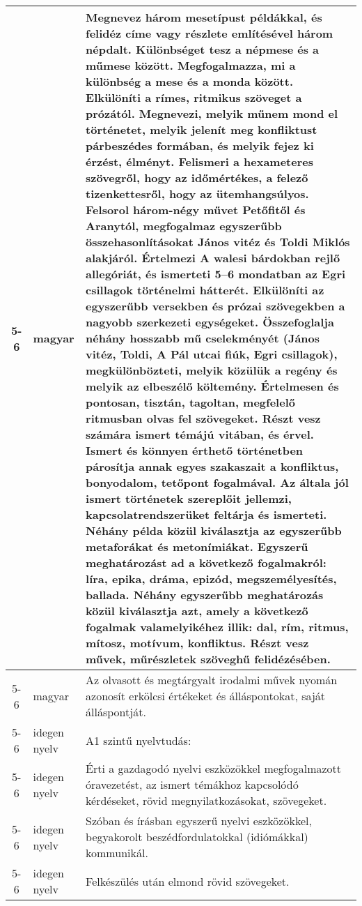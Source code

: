 \begin{small}
\begin{longtable}{c | p{2cm} |  p{11cm} }
              5-6 & magyar & Megnevez három mesetípust példákkal, és felidéz címe vagy részlete említésével három népdalt. Különbséget tesz a népmese és a műmese között. Megfogalmazza, mi a különbség a mese és a monda között. Elkülöníti a rímes, ritmikus szöveget a prózától. Megnevezi, melyik műnem mond el történetet, melyik jelenít meg konfliktust párbeszédes formában, és melyik fejez ki érzést, élményt. Felismeri a hexameteres szövegről, hogy az időmértékes, a felező tizenkettesről, hogy az ütemhangsúlyos. Felsorol három-négy művet Petőfitől és Aranytól, megfogalmaz egyszerűbb  összehasonlításokat János vitéz és Toldi Miklós alakjáról. Értelmezi A walesi bárdokban rejlő allegóriát, és ismerteti 5–6 mondatban az Egri csillagok történelmi hátterét. Elkülöníti az egyszerűbb versekben és prózai szövegekben a nagyobb szerkezeti egységeket. Összefoglalja néhány hosszabb mű cselekményét (János vitéz, Toldi, A Pál utcai fiúk, Egri csillagok), megkülönbözteti, melyik közülük a regény és melyik az elbeszélő költemény. Értelmesen és pontosan, tisztán, tagoltan, megfelelő ritmusban olvas fel szövegeket. Részt vesz számára ismert témájú vitában, és érvel. Ismert és könnyen érthető történetben párosítja annak egyes szakaszait a konfliktus, bonyodalom, tetőpont fogalmával. Az általa jól ismert történetek szereplőit jellemzi, kapcsolatrendszerüket feltárja és ismerteti. Néhány példa közül kiválasztja az egyszerűbb metaforákat és metonímiákat. Egyszerű meghatározást ad a következő fogalmakról: líra, epika, dráma, epizód, megszemélyesítés, ballada. Néhány egyszerűbb meghatározás közül kiválasztja azt, amely a következő fogalmak valamelyikéhez illik: dal, rím, ritmus, mítosz, motívum, konfliktus. Részt vesz művek, műrészletek szöveghű felidézésében.  \\ \hline
              5-6 & magyar & Az olvasott és megtárgyalt irodalmi művek nyomán azonosít erkölcsi értékeket és álláspontokat, saját álláspontját. \\ \hline
              5-6 & idegen nyelv & A1 szintű nyelvtudás: \\ \hline
              5-6 & idegen nyelv & Érti a gazdagodó nyelvi eszközökkel megfogalmazott óravezetést, az ismert témákhoz kapcsolódó kérdéseket, rövid megnyilatkozásokat, szövegeket. \\ \hline
              5-6 & idegen nyelv & Szóban és írásban egyszerű nyelvi eszközökkel, begyakorolt beszédfordulatokkal (idiómákkal) kommunikál. \\ \hline
              5-6 & idegen nyelv & Felkészülés után elmond rövid szövegeket. \\ \hline

\end{longtable}
\end{small}
